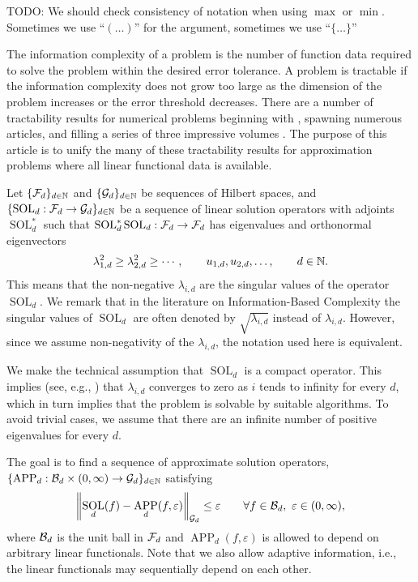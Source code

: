 \documentclass[sort&compress]{elsarticle}
\DeclareMathOperator{\SOL}{SOL}
\DeclareMathOperator{\APP}{APP}
\newcommand{\peter}[1]{\begingroup\color{purple}#1\endgroup}
\begin{document}
TODO: We should check consistency of notation when using $\max$ or $\min$. Sometimes we use ``$(\ldots)$'' for the argument, sometimes we use ``$\{\ldots\}$''

\bigskip

The information complexity of a problem is the number of function data required to solve the problem within the desired error tolerance.  A problem is tractable if the information complexity does not grow too large as the dimension of the problem increases or the error threshold decreases.  There are a number of tractability results for numerical problems beginning with \cite{?}, spawning numerous articles, and filling a series of three impressive volumes \cite{NovWoz08a,NovWoz10a,NovWoz12a}.  The purpose of this article is to unify the many of these tractability results for approximation problems where all linear functional data is available.

Let $\{\mathcal{F}_d\}_{d \in \mathbb{N}}$ and $\{\mathcal{G}_d\}_{d \in \mathbb{N}}$ be sequences of Hilbert spaces, and $\{\SOL_d : \cf_d \to \cg_d\}_{d \in \naturals}$ be a sequence of linear solution operators  with adjoints $\SOL_d^*$ such that $\SOL_d^*\SOL_d : \cf_d \to \cf_d$ has eigenvalues and orthonormal eigenvectors
\begin{equation} \label{eq:eigenvalues}
 \lambda_{1,d}^2 \ge \lambda_{2,d}^2 \ge \cdots, \qquad u_{1,d}, u_{2,d}, \ldots, \qquad d \in \mathbb{N}.
\end{equation}
This means that the non-negative $\lambda_{i,d}$ are the singular values of the operator $\SOL_d$. We remark that in the literature on Information-Based Complexity the singular values of $\SOL_d$ are often denoted by $\sqrt{\lambda_{i,d}}$ instead of $\lambda_{i,d}$. However, since we assume non-negativity of the $\lambda_{i,d}$, the notation used here is equivalent. 


We make the technical assumption that $\SOL_d$ is a compact operator. This implies (see, e.g., \cite{NovWoz08a}) that $\lambda_{i,d}$ converges to zero as $i$ tends to infinity for every $d$, which in turn implies that the problem is solvable by suitable algorithms. To avoid trivial cases, we assume that there are an infinite number of positive eigenvalues for every $d$.

The goal is to find a sequence of approximate solution operators, $\{\APP_d:\cb_d \times (0,\infty) \to \cg_d\}_{d \in \naturals}$ satisfying
\begin{equation}
    \label{eq:errcrit}
    \norm[\cg_d]{\SOL_d(f) - \APP_d(f,\varepsilon)} \le \varepsilon \qquad \forall f \in \cb_d, \ \varepsilon \in (0,\infty),
\end{equation}
where $\mathcal{B}_d$ is the unit ball in $\mathcal{F}_d$ and $\APP_d(f,\varepsilon)$ is allowed to depend on arbitrary linear functionals.  Note that we also allow adaptive information, i.e., the linear functionals may sequentially depend on each other.
\end{document}
